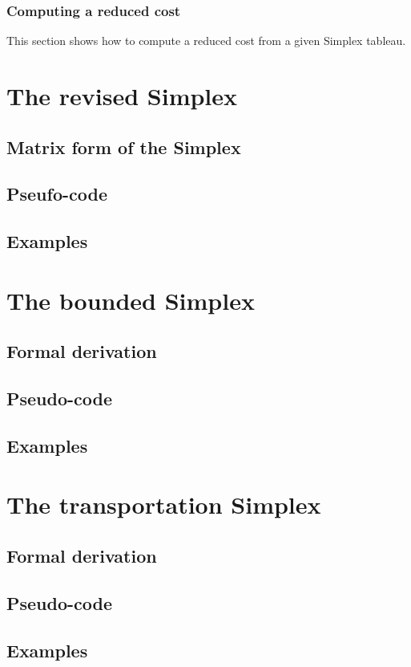 \subsubsection{Computing a reduced cost}

This section shows how to compute a reduced cost from a given Simplex tableau. 

\section{The revised Simplex}
\subsection{Matrix form of the Simplex}
\subsection{Pseufo-code}
\subsection{Examples}

\section{The bounded Simplex}
\subsection{Formal derivation}
\subsection{Pseudo-code}
\subsection{Examples}

\section{The transportation Simplex}
\subsection{Formal derivation}
\subsection{Pseudo-code}
\subsection{Examples}
